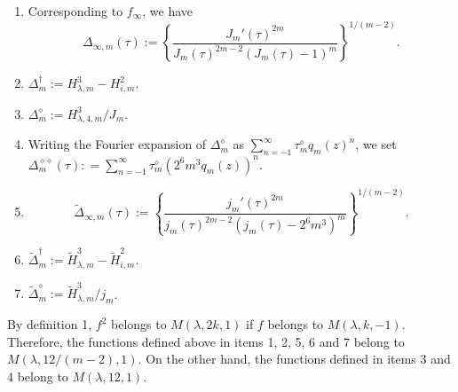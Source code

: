 \documentclass{article}
\begin{document}
 \begin{definition}
 \begin{enumerate}
 \item
  Corresponding to $f_{\infty}$,
 we have
 $$
 \Delta_{\infty,m}(\tau) := 
 \left \{ \frac{J_m'(\tau)^{2m}}
 {J_m(\tau)^{2m-2}(J_m(\tau)-1)^m}
\right \}^{1/(m-2)}.
 $$
 \item 
 $\Delta^{\dagger}_m := 
H_{\lambda,m}^3 - H_{i,m}^2$.
\item 
$\Delta^{\diamond}_m :=
H_{\lambda,4,m}^3/J_m$.
\item
Writing the Fourier expansion of $\Delta^{\diamond}_m$ as
$\sum_{n = -1}^{\infty}\tau^{\diamond}_m q_m(z)^n$,
we set \newline
$\Delta^{\diamond \diamond}_m(\tau): = 
\sum_{n = -1}^{\infty} \tau^{\diamond}_m (2^6 m^3 q_m(z))^n$.
  \item
 $$
 \widetilde{\Delta}_{\infty,m}(\tau) := 
 \left \{ \frac{j_m'(\tau)^{2m}}
 {j_m(\tau)^{2m-2}(j_m(\tau)-2^6 m^3)^m}
\right \}^{1/(m-2)}.
 $$
 \item
 $\widetilde{\Delta}^{\dagger}_m := 
\widetilde{H}_{\lambda,m}^3 - \widetilde{H}_{i,m}^2$.
\item
$\widetilde{\Delta}^{\diamond}_m := 
\widetilde{H}_{\lambda,m}^3/j_m$. 
 \end{enumerate}
 \end{definition} 
 \begin{remark}
 By definition 1, $f^2$ belongs to $M(\lambda, 2k, 1)$
 if $f$ belongs to $M(\lambda, k, -1)$. Therefore,
 the functions defined above in items 
 1, 2, 5, 6 and 7
 belong to $M(\lambda, 12/(m-2), 1)$.
 On the other hand, the functions defined in
 items 3 and 4 belong to $M(\lambda, 12, 1)$.
 \end{remark}
\end{document}
